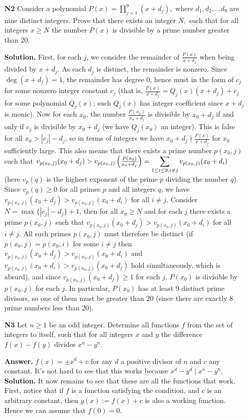 \documentclass[11pt,a4paper]{article}
\begin{document}
\begin{enumerate}
	\item[\textbf{N2}] Consider a polynomial $P(x) =  \prod^9_{j=1}(x+d_j),$ where $d_1, d_2, \ldots d_9$ are nine distinct integers. Prove that there exists an integer $N,$ such that for all integers $x \geq N$ the number $P(x)$ is divisible by a prime number greater than 20.
	
	\textbf{Solution.} First, for each $j$, we consider the remainder of $\frac{P(x)}{x+d_j}$ when being divided by $x+d_j$. As each $d_j$ is distinct, the remainder is nonzero. Since $\deg(x+d_j)=1$, the remainder has degree 0, hence must in the form of $c_j$ for some nonzero integer constant $c_j$ (that is, $\frac{P(x)}{x+d_j}=Q_j(x)(x+d_j)+c_j$ for some polynomial $Q_j(x)$; such $Q_j(x)$ has integer coefficient since $x+d_j$ is monic). Now for each $x_0$, the number $\frac{P(x_0)}{x_0+d_j}$ is divisible by $x_0+d_j$ if and only if $c_j$ is divisible by $x_0+d_j$ (we have $Q_j(x_0)$ an integer). This is false for all $x_0>|c_j|-d_j$, so in terms of integers we have $x_0+d_j\nmid \frac{P(x)}{x+d_j}$ for $x_0$ sufficiently large. This also means that there exists a prime number $p(x_0, j)$ such that $v_{p(x_0, j)}(x_0+d_j)> v_{p(x_0, j)}\left(\frac{P(x_0)}{x_0+d_j}\right)=\displaystyle\sum_{1\le i\le 9, i\neq j} v_{p(x_0, j)}(x_0+d_i)$ (here $v_p(q)$ is the highest exponent of the prime $p$ dividing the number $q$). 
	Since $v_p(q)\ge 0$ for all primes $p$ and all integers $q$, we have $v_{p(x_0, j)}(x_0+d_j)>v_{p(x_0, j)}(x_0+d_i)$ for all $i\neq j$. 
	Consider $N=\max\{|c_j|-d_j\}+1$, then for all $x_0\ge N$ and for each $j$ there exists a prime $p(x_0, j)$ such that $v_{p(x_0, j)}(x_0+d_j)>v_{p(x_0, j)}(x_0+d_i)$ for all $i\neq j$. 
	All such primes $p(x_0, j)$ must therefore be distinct (if $p(x_0, j)=p(x_0, i)$ for some $i\neq j$ then $v_{p(x_0, j)}(x_0+d_j)>v_{p(x_0, j)}(x_0+d_i)$ and $v_{p(x_0, j)}(x_0+d_i)>v_{p(x_0, j)}(x_0+d_j)$ hold simultaneously, which is absurd), and since $v_{p(x_0, j)}(x_0+d_j)\ge 1$ for each $j$, $P(x_0)$ is divisible by $p(x_0, j)$ for each $j$. In particular, $P(x_0)$ has at least 9 distinct prime divisors, so one of them must be greater than 20 (since there are exactly 8 prime numbers less than 20). 
	
	\item[\textbf{N3}] Let $n \geq 1$ be an odd integer. Determine all functions $f$ from the set of integers to itself, such that for all integers $x$ and $y$ the difference $f(x)-f(y)$ divides $x^n-y^n.$
	
	\textbf{Answer.} $f(x)=\pm x^d+c$ for any $d$ a positive divisor of $n$ and $c$ any constant. It's not hard to see that this works because $x^d-y^d\mid x^n-y^n$. \\
	\textbf{Solution.} It now remains to see that these are all the functions that work. First, notice that if $f$ is a function satisfying the condition, and $c$ is an arbitrary constant, then $g(x):=f(x)+c$ is also a working function. Hence we can assume that $f(0)=0$. 
	

\end{enumerate}
\end{document}
